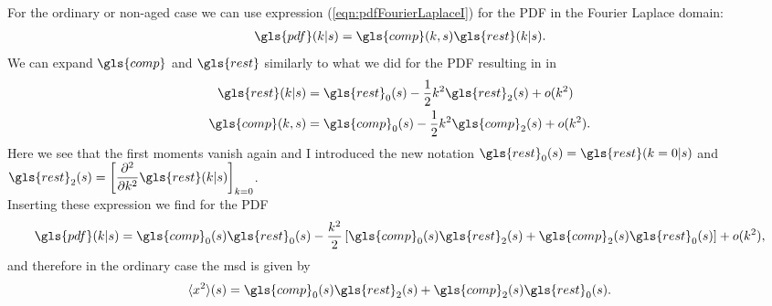 For the ordinary or non-aged case we can use expression (\ref{eqn:pdfFourierLaplaceI}) for the \gls{PDF} in the Fourier Laplace domain:
%
\begin{align}
\gls{pdf}(k|s) = \gls{comp}(k,s) \gls{rest}(k|s) .
\end{align}
%
We can expand $\gls{comp}$ and $\gls{rest}$ similarly to what we did for the \gls{PDF} resulting in in 
%
\begin{align}
\gls{rest}(k|s) &= \gls{rest}_0(s) - \frac{1}{2} k^2 \gls{rest}_2(s) + o(k^2) \label{eqn:rExpansion}\\
\gls{comp}(k,s) &= \gls{comp}_0(s)- \frac{1}{2} k^2 \gls{comp}_2(s) + o(k^2) .
\end{align}
%
Here we see that the first moments vanish again and I introduced the new notation $\gls{rest}_0(s) =   \gls{rest}(k=0|s) $ and $\gls{rest}_2 (s) =   \left[ \npder{}{k}{2} \gls{rest}(k|s) \right]_{k=0}$. \\
Inserting these expression we find for the \gls{PDF}
%
\begin{align}
\gls{pdf}(k|s)  = \gls{comp}_0(s)\gls{rest}_0(s) - \frac{k^2}{2}\left[\gls{comp}_0(s) \gls{rest}_2(s)+\gls{comp}_2(s)\gls{rest}_0(s)\right] +o(k^2) ,
\end{align}
%
and therefore in the ordinary case the \gls{msd} is given by 
%
\begin{align}
\mean{x^2}(s) = \gls{comp}_0(s) \gls{rest}_2(s)+\gls{comp}_2(s)\gls{rest}_0(s) \label{eqn:x2Ordinary}. 
\end{align}

